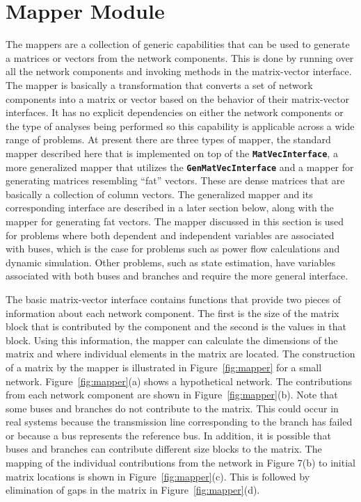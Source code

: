 \section{Mapper Module}

The mappers are a collection of generic capabilities that can be used to generate a matrices or vectors from the network components. This is done by running over all the network components and invoking methods in the matrix-vector interface. The mapper is basically a transformation that converts a set of network components into a matrix or vector based on the behavior of their matrix-vector interfaces. It has no explicit dependencies on either the network components or the type of analyses being performed so this capability is applicable across a wide range of problems. At present there are three types of mapper, the standard mapper described here that is implemented on top of the \texttt{\textbf{MatVecInterface}}, a more generalized mapper that utilizes the \texttt{\textbf{GenMatVecInterface}} and a mapper for generating matrices resembling ``fat'' vectors. These are dense matrices that are basically a collection of column vectors. The generalized mapper and its corresponding interface are described in a later section below, along with the mapper for generating fat vectors. The mapper discussed in this section is used for problems where both dependent and independent variables are associated with buses, which is the case for problems such as power flow calculations and dynamic simulation. Other problems, such as state estimation, have variables associated with both buses and branches and require the more general interface.

The basic matrix-vector interface contains functions that provide two pieces of
information about each network component. The first is the size of the matrix
block that is contributed by the component and the second is the values in that
block. Using this information, the mapper can calculate the dimensions of the
matrix and where individual elements in the matrix are located. The construction
of a matrix by the mapper is illustrated in  Figure~\ref{fig:mapper} for a small
network. Figure~\ref{fig:mapper}(a) shows a hypothetical network. The
contributions from each network component are shown in
Figure~\ref{fig:mapper}(b). Note that some buses and branches do not contribute
to the matrix. This could occur in real systems because the transmission line
corresponding to the branch has failed or because a bus represents the reference
bus. In addition, it is possible that buses and branches can contribute
different size blocks to the matrix. The mapping of the individual contributions
from the network in Figure 7(b) to initial matrix locations is shown in
Figure~\ref{fig:mapper}(c). This is followed by elimination of gaps in the
matrix in Figure~\ref{fig:mapper}(d).

